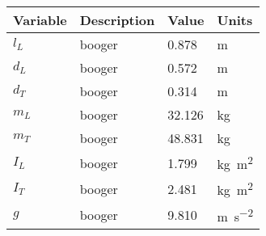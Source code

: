 
\begin{tabular}{llll}
  \toprule
  Variable & Description & Value & Units \\
  \midrule
$l_{L}$ & booger & 0.878 & \si{\meter} \\
$d_{L}$ & booger & 0.572 & \si{\meter} \\
$d_{T}$ & booger & 0.314 & \si{\meter} \\
$m_{L}$ & booger & 32.126 & \si{\kilogram} \\
$m_{T}$ & booger & 48.831 & \si{\kilogram} \\
$I_{L}$ & booger & 1.799 & \si{\kilogram\meter\squared} \\
$I_{T}$ & booger & 2.481 & \si{\kilogram\meter\squared} \\
$g$ & booger & 9.810 & \si{\meter\per\second\squared} \\
  \bottomrule
\end{tabular}